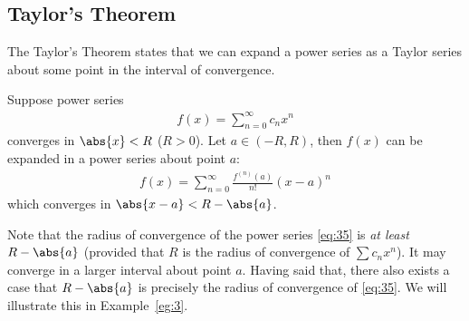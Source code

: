 \documentclass[thmcnt=section, 12pt]{elegantbook}
\begin{document}

\subsection{Taylor's Theorem}


\par The Taylor's Theorem states that we can expand a power series as a Taylor series about some point in the interval of convergence.

\begin{theorem} \label{thm:19}
    Suppose power series
    \begin{align*}
        f(x) = \sum_{n=0}^\infty c_n x^n
    \end{align*}
    converges in $\abs{x} < R$ ($R > 0$). Let $a \in (-R, R)$, then $f(x)$ can be expanded in a power series about point $a$:
    \begin{align}
        f(x) = \sum_{n=0}^\infty \frac{f^{(n)}(a)}{n!} (x-a)^n
        \label{eq:35}
    \end{align}
    which converges in $\abs{x-a} < R - \abs{a}$.
\end{theorem}

\begin{remark}
    Note that the radius of convergence of the power series \eqref{eq:35} is \textit{at least} $R - \abs{a}$ (provided that $R$ is the radius of convergence of $\sum c_n x^n$). It may converge in a larger interval about point $a$. Having said that, there also exists a case that $R - \abs{a}$ is precisely the radius of convergence of \eqref{eq:35}. We will illustrate this in Example~\ref{eg:3}.
\end{remark}
\end{document}
